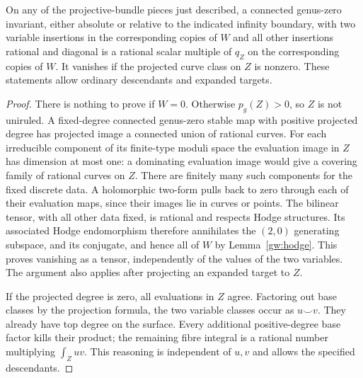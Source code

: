 \begin{lemma}\label{gw:local}
On any of the projective-bundle pieces just described, a connected
genus-zero invariant, either absolute or relative to the indicated infinity
boundary, with two variable insertions in the corresponding
copies of $W$ and all other insertions rational and diagonal is a
rational scalar multiple of $q_Z$ on the corresponding copies of $W$.
It vanishes if the projected curve class on $Z$ is nonzero.  These statements
allow ordinary descendants and expanded targets.
\end{lemma}
\begin{proof}
There is nothing to prove if $W=0$.  Otherwise $p_g(Z)>0$, so $Z$ is not
uniruled.  A fixed-degree connected genus-zero stable map with positive
projected degree has projected image a connected union of rational curves.
For each irreducible component of its finite-type moduli space the evaluation
image in $Z$ has dimension at most one: a dominating evaluation image would
give a covering family of rational curves on $Z$.  There are finitely many
such components for the fixed discrete data.  A holomorphic two-form pulls
back to zero through each of their evaluation maps, since their images lie
in curves or points.  The bilinear tensor, with all other data fixed, is
rational and respects Hodge structures.  Its associated Hodge endomorphism
therefore annihilates the $(2,0)$ generating subspace, and its conjugate,
and hence all of $W$ by Lemma~\ref{gw:hodge}.  This proves vanishing as a
tensor, independently of the values of the two variables.  The argument
also applies after projecting an expanded target to $Z$.

If the projected degree is zero, all evaluations in $Z$ agree.  Factoring out
base classes by the projection formula, the two variable classes occur as
$u\smile v$.  They already have top degree on the surface.  Every additional
positive-degree base factor kills their product; the remaining fibre
integral is a rational number multiplying $\int_Zuv$.  This reasoning is
independent of $u,v$ and allows the specified descendants.
\end{proof}

